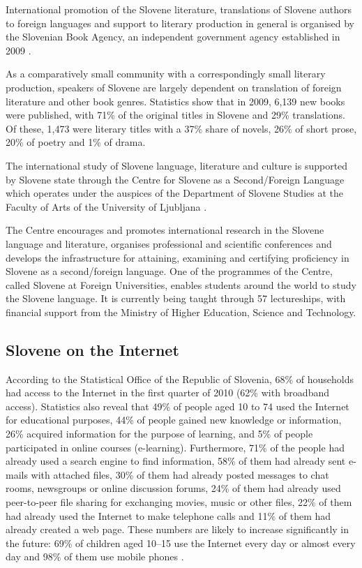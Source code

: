 \begin{multicols}{2}
International promotion of the Slovene literature, translations of Slovene authors to foreign languages and support to literary production in general is organised by the Slovenian Book Agency, an independent government agency established in 2009 \cite{JAKRS1}.  

As a comparatively small community with a correspondingly small literary production, speakers of Slovene are largely dependent on translation of foreign literature and other book genres. Statistics show that in 2009, 6,139 new books were published, with 71\% of the original titles in Slovene and 29\% translations. Of these, 1,473 were literary titles with a 37\% share of novels, 26\% of short prose, 20\% of poetry and 1\% of drama. 

The international study of Slovene language, literature and culture is supported by Slovene state through the Centre for Slovene as a Second/Foreign Language which operates under the auspices of the Department of Slovene Studies at the Faculty of Arts of the University of Ljub\-ljana \cite{CSDTJ1}.  


The Centre encourages and promotes international research in the Slovene language and literature, organises professional and scientific conferences and develops the infrastructure for attaining, examining and certifying proficiency in Slovene as a second/foreign language. One of the programmes of the Centre, called Slovene at Foreign Universities, enables students around the world to study the Slovene language. It is currently being taught through 57 lectureships, with financial support from the Ministry of Higher Education, Science and Technology.

\subsection{Slovene on the Internet}

According to the Statistical Office of the Republic of Slovenia, 68\% of households had access to the Internet in the first quarter of 2010 (62\% with broadband access). Statistics also reveal that 49\% of people aged 10 to 74 used the Internet for educational purposes, 44\% of people gained new knowledge or information, 26\% acquired information for the purpose of learning, and 5\% of people participated in online courses (e-learning). Furthermore, 71\% of the people had already used a search engine to find information, 58\% of them had already sent e-mails with attached files, 30\% of them had already posted messages to chat rooms, newsgroups or online discussion forums, 24\% of them had already used peer-to-peer file sharing for exchanging movies, music or other files, 22\% of them had already used the Internet to make telephone calls and 11\% of them had already created a web page. These numbers are likely to increase significantly in the future: 69\% of children aged 10--15 use the Internet every day or almost every day and 98\% of them use mobile phones  \cite{SURS3}. 


\end{multicols}

